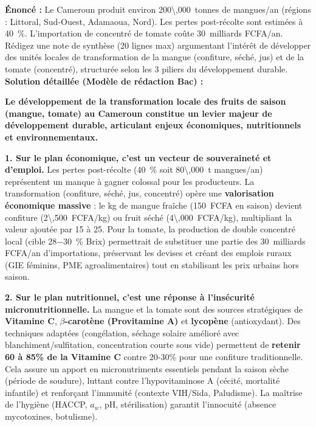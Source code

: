 \documentclass[11pt]{article}
\begin{document}
\begin{exoresolu}
    \textbf{Énoncé :} Le Cameroun produit environ \SI{200\,000}{tonnes} de mangues/an (régions : Littoral, Sud-Ouest, Adamaoua, Nord). Les pertes post-récolte sont estimées à \SI{40}{\%}. L'importation de concentré de tomate coûte \SI{30}{milliards} FCFA/an. 
    Rédigez une note de synthèse (20 lignes max) argumentant l'intérêt de développer des unités locales de transformation de la mangue (confiture, séché, jus) et de la tomate (concentré), structurée selon les 3 piliers du développement durable.
    \tcblower
    \textbf{Solution détaillée (Modèle de rédaction Bac) :}
    
    \textbf{Le développement de la transformation locale des fruits de saison (mangue, tomate) au Cameroun constitue un levier majeur de développement durable, articulant enjeux économiques, nutritionnels et environnementaux.}
    
    \textbf{1. Sur le plan économique, c'est un vecteur de souveraineté et d'emploi.}
    Les pertes post-récolte (\SI{40}{\%} soit \SI{80\,000}{t} mangues/an) représentent un manque à gagner colossal pour les producteurs. La transformation (confiture, séché, jus, concentré) opère une \textbf{valorisation économique massive} : le kg de mangue fraîche (\SI{150}{FCFA} en saison) devient confiture (\SI{2\,500}{FCFA/kg}) ou fruit séché (\SI{4\,000}{FCFA/kg}), multipliant la valeur ajoutée par 15 à 25. Pour la tomate, la production de double concentré local (cible \SI{28-30}{\%} Brix) permettrait de substituer une partie des \SI{30}{milliards} FCFA/an d'importations, préservant les devises et créant des emplois ruraux (GIE féminins, PME agroalimentaires) tout en stabilisant les prix urbains hors saison.
    
    \textbf{2. Sur le plan nutritionnel, c'est une réponse à l'insécurité micronutritionnelle.}
    La mangue et la tomate sont des sources stratégiques de \textbf{Vitamine C}, \textbf{$\beta$-carotène (Provitamine A)} et \textbf{lycopène} (antioxydant). Des techniques adaptées (congélation, séchage solaire amélioré avec blanchiment/sulfitation, concentration courte sous vide) permettent de \textbf{retenir 60 à 85\% de la Vitamine C} contre 20-30\% pour une confiture traditionnelle. Cela assure un apport en micronutriments essentiels pendant la saison sèche (période de soudure), luttant contre l'hypovitaminose A (cécité, mortalité infantile) et renforçant l'immunité (contexte VIH/Sida, Paludisme). La maîtrise de l'hygiène (HACCP, $a_w$, pH, stérilisation) garantit l'innocuité (absence mycotoxines, botulisme).
    

\end{exoresolu}
\end{document}
